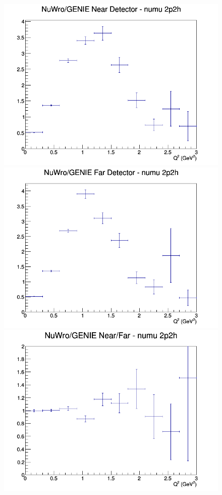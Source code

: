 \documentclass[12pt]{article}
\begin{document}
\begin{figure}[h]
\endminipage
\newline
{}
\includegraphics[width=\linewidth]{Q2/nominal/ratios/2p2h_NuWro_GENIE_numu_near_Q2.png}
\endminipage
{}
\includegraphics[width=\linewidth]{Q2/nominal/ratios/2p2h_NuWro_GENIE_numu_far_Q2.png}
\endminipage
{}
\includegraphics[width=\linewidth]{Q2/nominal/ratios/2p2h_NuWro_GENIE_numu_NF_Q2.png}
\endminipage
\newline
\end{figure}
\clearpage
\end{document}
